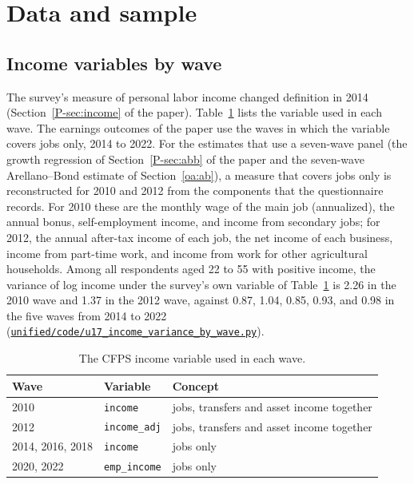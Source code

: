 \documentclass[11pt]{article}
\numberwithin{equation}{section}
\newcommand{\repourl}{https://github.com/JiachenJin1001/before-the-labor-market-or-inside-it}
\newcommand{\code}[1]{\href{\repourl/blob/main/#1}{\nolinkurl{#1}}}
\begin{document}
\section{Data and sample}
\label{oa:data}

\subsection{Income variables by wave}

The survey's measure of personal labor income changed definition in 2014
(Section~\ref{P-sec:income} of the paper). Table~\ref{oatab:income}
lists the variable used in each wave. The earnings outcomes of the
paper use the waves in which the variable covers jobs only, 2014 to
2022. For the estimates that use a seven-wave panel (the growth regression of Section~\ref{P-sec:abb} of the paper and the seven-wave Arellano--Bond estimate of Section~\ref{oa:ab}), a measure that covers jobs only is reconstructed for 2010 and
2012 from the components that the questionnaire records. For 2010 these
are the monthly wage of the main job (annualized), the annual bonus,
self-employment income, and income from secondary jobs; for 2012, the
annual after-tax income of each job, the net income of each business,
income from part-time work, and income from work for other agricultural
households. Among all respondents aged 22 to 55 with positive income, the variance of log income under the survey's own variable of Table~\ref{oatab:income} is 2.26 in the 2010 wave and 1.37 in the 2012 wave, against 0.87, 1.04, 0.85, 0.93, and 0.98 in the five waves from 2014 to 2022 (\code{unified/code/u17_income_variance_by_wave.py}).

\begin{table}[H]
\centering
\small
\caption{The CFPS income variable used in each wave.}
\label{oatab:income}
\begin{tabular}{@{}lll@{}}
\toprule
Wave & Variable & Concept \\
\midrule
2010 & \texttt{income} & jobs, transfers and asset income together \\
2012 & \texttt{income\_adj} & jobs, transfers and asset income together \\
2014, 2016, 2018 & \texttt{income} & jobs only \\
2020, 2022 & \texttt{emp\_income} & jobs only \\
\bottomrule
\end{tabular}
\end{table}
\end{document}
